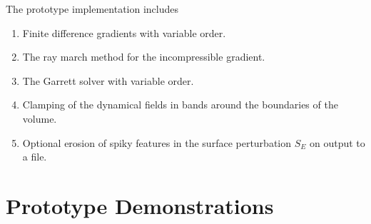 \documentclass{article}
\begin{document}
The prototype implementation includes
\begin{enumerate}
\item Finite difference gradients with variable order.
\item The ray march method for the incompressible gradient.
\item The Garrett solver with variable order.
\item Clamping of the dynamical fields in bands around the boundaries of the volume.
\item Optional erosion of spiky features in the surface perturbation $S_E$ on output to a file.
\end{enumerate}




\section{Prototype Demonstrations}\label{demos}
\end{document}
